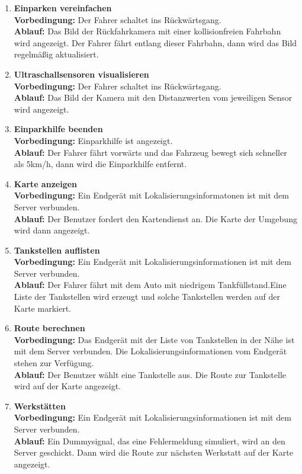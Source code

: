 \documentclass[pflichtenheft.tex]{subfiles}
\begin{document}
\begin{enumerate}
\item{\textbf{Einparken vereinfachen}} \\
\textbf{Vorbedingung: } Der Fahrer schaltet ins Rückwärtsgang. \\
\textbf{Ablauf: } Das Bild der Rückfahrkamera mit einer kollisionfreien
Fahrbahn wird angezeigt. Der Fahrer fährt entlang dieser Fahrbahn, dann wird das
Bild regelmäßig aktualisiert.

\item{\textbf{Ultraschallsensoren visualisieren}} \\
\textbf{Vorbedingung: } Der Fahrer schaltet ins Rückwärtsgang. \\
\textbf{Ablauf: } Das Bild der Kamera mit den Distanzwerten vom jeweiligen
Sensor wird angezeigt.

\item{\textbf{Einparkhilfe beenden}} \\
\textbf{Vorbedingung: } Einparkhilfe ist angezeigt. \\
\textbf{Ablauf: } Der Fahrer fährt vorwärts und das Fahrzeug bewegt sich
schneller als 5km/h, dann wird die Einparkhilfe entfernt.

\item{\textbf{Karte anzeigen}} \\
\textbf{Vorbedingung: } Ein Endgerät mit Lokalisierungsinformatonen ist mit dem
Server verbunden.\\
\textbf{Ablauf: } Der Benutzer fordert den Kartendienst an. Die Karte der
Umgebung wird dann angezeigt.

\item{\textbf{Tankstellen auflisten}} \\
\textbf{Vorbedingung: } Ein Endgerät mit Lokalisierungsinformationen ist mit dem
Server verbunden.\\
\textbf{Ablauf: } Der Fahrer fährt mit dem Auto mit niedrigem Tankfüllstand.Eine
Liste der Tankstellen wird erzeugt und solche Tankstellen werden auf der
Karte markiert. 

\item{\textbf{Route berechnen}} \\
\textbf{Vorbedingung: } Das Endgerät mit der Liste von Tankstellen in der Nähe
ist mit dem Server verbunden. Die Lokalisierungsinformationen vom Endgerät
stehen zur Verfügung.\\
\textbf{Ablauf: } Der Benutzer wählt eine Tankstelle aus. Die Route zur
Tankstelle wird auf der Karte angezeigt.

\item{\textbf{Werkstätten}} \\
\textbf{Vorbedingung: } Ein Endgerät mit Lokalisierungsinformationen ist mit dem
Server verbunden. \\
\textbf{Ablauf: } Ein Dummysignal, das eine Fehlermeldung simuliert, wird
an den Server geschickt. Dann wird die Route zur nächsten Werkstatt auf der
Karte angezeigt.



\end{enumerate}
\end{document}

